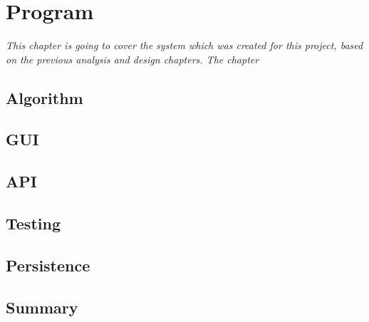 \chapter{Program}

\textit{This chapter is going to cover the system which was created for this project, based on the previous analysis and design chapters. The chapter }

\section{Algorithm}
\label{AlgorithmProg}

\section{GUI}
\label{GUI}

\section{API}
\label{API}

\section{Testing}
\label{Testing}

\section{Persistence}
\label{Persistence}

\section{Summary}
\label{ProSummary}